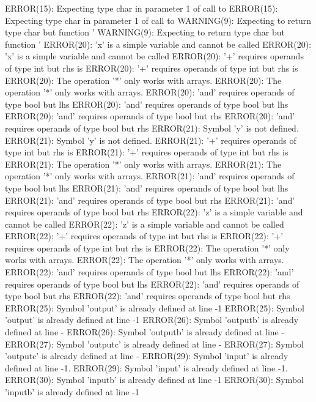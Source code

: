 \documentclass[12pt]{book}
\begin{document}
ERROR(15): Expecting type char in parameter 1 of call to        ERROR(15): Expecting type char in parameter 1 of call to
WARNING(9): Expecting to return type char but function '        WARNING(9): Expecting to return type char but function '
ERROR(20): 'x' is a simple variable and cannot be called        ERROR(20): 'x' is a simple variable and cannot be called
ERROR(20): '+' requires operands of type int but rhs is         ERROR(20): '+' requires operands of type int but rhs is 
ERROR(20): The operation '*' only works with arrays.                ERROR(20): The operation '*' only works with arrays.
ERROR(20): 'and' requires operands of type bool but lhs         ERROR(20): 'and' requires operands of type bool but lhs 
ERROR(20): 'and' requires operands of type bool but rhs         ERROR(20): 'and' requires operands of type bool but rhs 
ERROR(21): Symbol 'y' is not defined.                                ERROR(21): Symbol 'y' is not defined.
ERROR(21): '+' requires operands of type int but rhs is         ERROR(21): '+' requires operands of type int but rhs is 
ERROR(21): The operation '*' only works with arrays.                ERROR(21): The operation '*' only works with arrays.
ERROR(21): 'and' requires operands of type bool but lhs         ERROR(21): 'and' requires operands of type bool but lhs 
ERROR(21): 'and' requires operands of type bool but rhs         ERROR(21): 'and' requires operands of type bool but rhs 
ERROR(22): 'z' is a simple variable and cannot be called        ERROR(22): 'z' is a simple variable and cannot be called
ERROR(22): '+' requires operands of type int but rhs is         ERROR(22): '+' requires operands of type int but rhs is 
ERROR(22): The operation '*' only works with arrays.                ERROR(22): The operation '*' only works with arrays.
ERROR(22): 'and' requires operands of type bool but lhs         ERROR(22): 'and' requires operands of type bool but lhs 
ERROR(22): 'and' requires operands of type bool but rhs         ERROR(22): 'and' requires operands of type bool but rhs 
ERROR(25): Symbol 'output' is already defined at line -1        ERROR(25): Symbol 'output' is already defined at line -1
ERROR(26): Symbol 'outputb' is already defined at line -        ERROR(26): Symbol 'outputb' is already defined at line -
ERROR(27): Symbol 'outputc' is already defined at line -        ERROR(27): Symbol 'outputc' is already defined at line -
ERROR(29): Symbol 'input' is already defined at line -1.        ERROR(29): Symbol 'input' is already defined at line -1.
ERROR(30): Symbol 'inputb' is already defined at line -1        ERROR(30): Symbol 'inputb' is already defined at line -1
\end{document}
